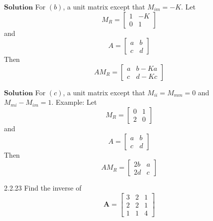 $\boxed{\textbf{Solution}}$  For $(b)$, a unit matrix except that $M_{i m}=-K$.
Let 
$$M_{R}=\left[\begin{array}{cc}1 & -K \\ 0 & 1\end{array}\right]$$ 
and 
$$A=\left[\begin{array}{ll}a & b \\ c & d\end{array}\right]$$
Then 
$$A M_{R}=\left[\begin{array}{ll}a & b-K a \\ c & d-K c\end{array}\right]$$


$\boxed{\textbf{Solution}}$  For $(c)$, a unit matrix except that $M_{i i}=M_{m m}=0$ and $M_{m i}-M_{i m}=1$.
Example: Let 
$$M_{R}=\left[\begin{array}{ll}0 & 1 \\ 2 & 0\end{array}\right]$$ 
and 
$$A=\left[\begin{array}{ll}a & b \\ c & d\end{array}\right]$$
Then 
$$A M_{R}=\left[\begin{array}{ll}2 b & a \\ 2 d & c\end{array}\right]$$


\newpage



\begin{mybox}{2.2.23}
Find the inverse of
$$
\mathbf{A}=\begin{bmatrix}{3} & {2} & {1} \\ {2} & {2} & {1} \\ {1} & {1} & {4}\end{bmatrix}
$$
\end{mybox}


